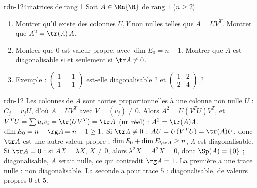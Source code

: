 \begin{exo}{rdn-12}{4}{matrices de rang 1}
Soit $A\in\Mn{\R}$ de rang $1$ ($n\geq2$).
\begin{enumerate}
\item Montrer qu'il existe des colonnes $U,V$ non nulles telles que $A=UV^T$. Montrer que $A^2=\tr(A)\,A$.
\item Montrer que $0$ est valeur propre, avec $\dim E_0=n-1$. Montrer que $A$ est diagonalisable si et seulement si $\tr A\neq0$.
\item Exemple : $\begin{pmatrix}1&-1\\1&-1\end{pmatrix}$ est-elle diagonalisable ? et $\begin{pmatrix}1&2\\2&4\end{pmatrix}$ ?
\end{enumerate}
\end{exo}
\begin{corrige}{rdn-12}
 Les colonnes de $A$ sont toutes proportionnelles à une colonne non nulle $U$ : $C_j=v_jU$, d'où $A=UV^T$ avec $V=(v_j)\neq0$.
Alors $A^2=U(V^TU)V^T$, et $V^TU=\sum u_iv_i=\tr(UV^T)=\tr A$ (un réel) : $A^2=\tr(A)A$.
 $\dim E_0=n-\rg A=n-1\geq1$. Si $\tr A\neq0$ : $AU=U(V^TU)=\tr(A)U$, donc $\tr A$ est une autre valeur propre ; $\dim E_0+\dim E_{\tr A}\geq n$,
$A$ est diagonalisable. Si $\tr A=0$ : si $AX=\lambda X$, $X\neq0$, alors $\lambda^2X=A^2X=0$, donc $\Sp(A)=\{0\}$ ; diagonalisable,
$A$ serait nulle, ce qui contredit $\rg A=1$.
 La première a une trace nulle : non diagonalisable. La seconde a pour trace $5$ : diagonalisable, de valeurs propres $0$ et $5$.
\end{corrige}

